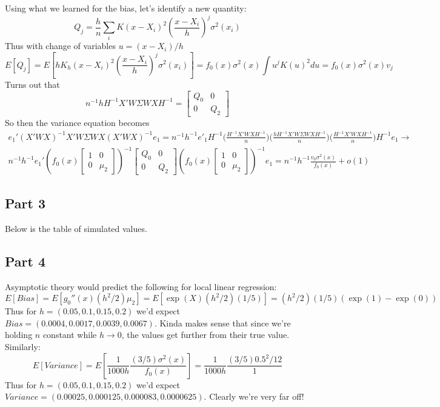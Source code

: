 \documentclass{article}
\begin{document}
Using what we learned for the bias, let's identify a new quantity:
\[
Q_j = \frac{h}{n} \sum_i K(x - X_i)^2 (\frac{x - X_i}{h})^j \sigma^2(x_i)
\]
Thus with change of variables $u = (x - X_i)/h$
\[
E[Q_j] = E[h K_h(x - X_i)^2  (\frac{x - X_i}{h})^j \sigma^2(x_i) ] = f_0(x) \sigma^2(x) \int u^j K(u)^2 du = f_0(x) \sigma^2(x) v_j
\]
Turns out that
\[
n^{-1} h H^{-1} X' W \Sigma W X H^{-1} = \begin{bmatrix} Q_0 & 0 \\ 0 & Q_2 \end{bmatrix}
\]
So then the variance equation becomes
\begin{align*}
e_1'(X'WX)^{-1}X'W \Sigma W X (X'WX)^{-1} e_1 = n^{-1}h^{-1}e'_1 H^{-1} \Big(\frac{H^{-1} X' W X H^{-1}}{n}\Big) \Big(\frac{h H^{-1} X'W \Sigma W X H^{-1}}{n} \Big) \Big(\frac{H^{-1} X' W X H^{-1}}{n}\Big)H^{-1} e_1 \rightarrow \\
n^{-1} h^{-1}e_1'(f_0(x) \begin{bmatrix} 1 & 0 \\ 0 & \mu_2 \end{bmatrix})^{-1} \begin{bmatrix} Q_0 & 0 \\ 0 & Q_2 \end{bmatrix}(f_0(x) \begin{bmatrix} 1 & 0 \\ 0 & \mu_2 \end{bmatrix})^{-1}e_1 = n^{-1}h^{-1} \frac{v_0 \sigma^2(x)}{f_0(x)} + o(1)
\end{align*}
\subsection{Part 3}
Below is the table of simulated values. 

\subsection{Part 4}
Asymptotic theory would predict the following for local linear regression:
\[
E[Bias] = E[g_0''(x)(h^2/2)\mu_2] = E[\exp(X)(h^2/2) (1/5)] = (h^2/2) (1/5)(\exp(1) - \exp(0))
\]
Thus for $h = (0.05,0.1,0.15,0.2)$ we'd expect $Bias = (0.0004,0.0017,0.0039,0.0067)$. Kinda makes sense that since we're holding $n$ constant while $h \rightarrow 0$, the values get further from their true value. Similarly:
\[
E[Variance] =E[ \frac{1}{1000h}\frac{(3/5) \sigma^2(x)}{ f_0(x)}] = \frac{1}{1000h}\frac{(3/5) 0.5^2/12}{1}
\]
 Thus for $h = (0.05,0.1,0.15,0.2)$ we'd expect $Variance = (0.00025, 0.000125,0.000083,0.0000625)$. Clearly we're very far off!
\end{document}
